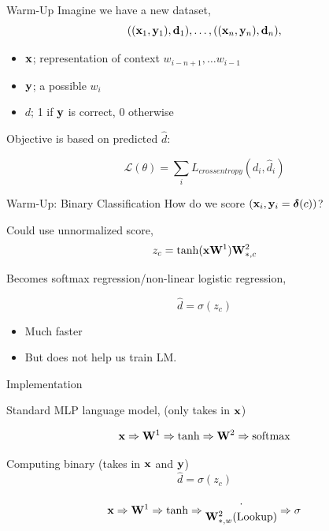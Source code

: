 \documentclass{beamer}
\begin{document}
\begin{frame}{Warm-Up}
 Imagine we have a new dataset, 
  \[ ((\mathbf{x}_1, \mathbf{y}_1), \mathbf{d}_1),\ldots, ((\mathbf{x}_n, \mathbf{y}_n), \mathbf{d}_n), \]
 
  \begin{itemize}
  \item $\mathbf{x}$; representation of context  $w_{i-n+1}, \ldots w_{i-1}$ 
  \item $\mathbf{y}$; a possible $w_i$
  \item $d$; 1 if $\mathbf{y}$ is correct, 0 otherwise
  \end{itemize}
  
  Objective is based on predicted $\hat{d}$:

  \[ \mathcal{L}(\theta) = \sum_{i} L_{crossentropy}(d_i, \hat{d}_i) \] 
\end{frame}


\begin{frame}{Warm-Up: Binary Classification}
  How do we score $(\mathbf{x}_i, \mathbf{y}_i = \boldsymbol{\delta}(c))$? 
\air 

Could use unnormalized score,
  \[ z_c = \tanh(\mathbf{x} \mathbf{W}^1)\mathbf{W}^2_{*,c}  \] 


  Becomes softmax regression/non-linear logistic regression,

  \[\hat{d} = \sigma(z_c)\]

  \begin{itemize}
  \item Much faster
  \item  But does not help us train LM.
  \end{itemize}

\end{frame}


\begin{frame}{Implementation}
  
  Standard MLP language model, (only takes in $\mathbf{x}$) 

  \[\boldx \Rightarrow \boldW^1 \Rightarrow \tanh \Rightarrow  \boldW^2 \Rightarrow \softmax\]



  Computing binary  (takes in $\mathbf{x}$ and $\mathbf{y}$) 
  \[\hat{d} = \sigma(z_c)\]

 \[\mathbf{x} \Rightarrow \mathbf{W}^1 \Rightarrow \tanh \Rightarrow
 \begin{matrix}
   \cdot \\ 
   \mathbf{W}^2_{*, w} \mathrm{(Lookup)}
 \end{matrix}
\Rightarrow \sigma\]
\end{frame}
\end{document}
